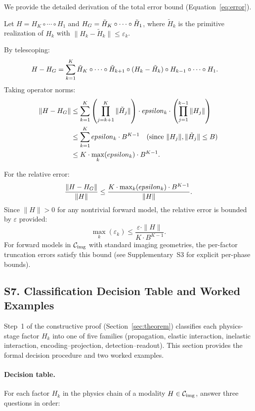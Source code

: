 We provide the detailed derivation of the total error bound (Equation~\ref{eq:error}).

Let $H = H_K \circ \cdots \circ H_1$ and $H_{G} = \tilde{H}_K \circ \cdots \circ \tilde{H}_1$, where $\tilde{H}_k$ is the primitive realization of $H_k$ with $\|H_k - \tilde{H}_k\| \leq \varepsilon_k$.

By telescoping:
\begin{align}
  H - H_{G} &= \sum_{k=1}^{K} \tilde{H}_K \circ \cdots \circ \tilde{H}_{k+1} \circ (H_k - \tilde{H}_k) \circ H_{k-1} \circ \cdots \circ H_1.
\end{align}
Taking operator norms:
\begin{align}
  \|H - H_{G}\| &\leq \sum_{k=1}^{K} \left(\prod_{j=k+1}^{K} \|\tilde{H}_j\|\right) \cdot epsilon_k \cdot \left(\prod_{j=1}^{k-1} \|H_j\|\right) \\
  &\leq \sum_{k=1}^{K} epsilon_k \cdot B^{K-1} \quad (\text{since } \|H_j\|, \|\tilde{H}_j\| \leq B) \\
  &\leq K \cdot \max_k(epsilon_k) \cdot B^{K-1}.
\end{align}

For the relative error:
\begin{equation}
  \frac{\|H - H_{G}\|}{\|H\|} \leq \frac{K \cdot \max_k(epsilon_k) \cdot B^{K-1}}{\|H\|}.
\end{equation}
Since $\|H\| > 0$ for any nontrivial forward model, the relative error is bounded by $\varepsilon$ provided:
\begin{equation}
  \max_k(\varepsilon_k) \leq \frac{\varepsilon \cdot \|H\|}{K \cdot B^{K-1}}.
\end{equation}
For forward models in $\mathcal{C}_{\mathrm{img}}$ with standard imaging geometries, the per-factor truncation errors satisfy this bound (see Supplementary~S3 for explicit per-phase bounds).


\subsection*{S7. Classification Decision Table and Worked Examples}
\label{sec:supp_decision}

Step~1 of the constructive proof (Section~\ref{sec:theorem}) classifies each physics-stage factor $H_k$ into one of five families (propagation, elastic interaction, inelastic interaction, encoding--projection, detection--readout). This section provides the formal decision procedure and two worked examples.

\paragraph{Decision table.}
For each factor $H_k$ in the physics chain of a modality $H \in \mathcal{C}_{\mathrm{img}}$, answer three questions in order:

